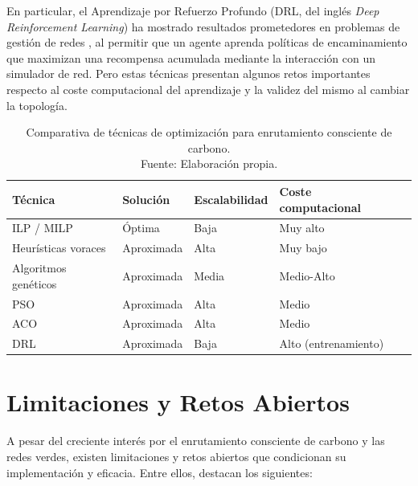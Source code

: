 En particular, el Aprendizaje por Refuerzo Profundo (DRL, del inglés \textit{Deep Reinforcement Learning}) ha mostrado resultados prometedores en problemas de gestión de redes \cite{mao2016drl}, al permitir que un agente aprenda políticas de encaminamiento que maximizan una recompensa acumulada mediante la interacción con un simulador de red. Pero estas técnicas presentan algunos retos importantes respecto al coste computacional del aprendizaje y la validez del mismo al cambiar la topología.

\begin{table}[h]
    \centering
    \captionsetup{justification=centering}
    \label{tab:comparativa_optimizacion}
    \renewcommand{\arraystretch}{1.4}
    \begin{tabular}{|l|l|l|l|l|}
        \hline
        \textbf{Técnica} & \textbf{Solución} & \textbf{Escalabilidad} & \textbf{Coste computacional} \\
        \hline
        ILP / MILP         & Óptima       & Baja    & Muy alto  \\
        
        Heurísticas voraces & Aproximada  & Alta    & Muy bajo  \\
        
        Algoritmos genéticos & Aproximada & Media    & Medio-Alto     \\
        
        PSO                & Aproximada   & Alta    & Medio     \\
        
        ACO                & Aproximada   & Alta    & Medio     \\
        
        DRL                & Aproximada   & Baja    & Alto (entrenamiento)  \\
        \hline
    \end{tabular}
    \caption[Comparativa técnicas de optimización]{Comparativa de técnicas de optimización para enrutamiento consciente de carbono.\\Fuente: Elaboración propia.}
\end{table}

\section{Limitaciones y Retos Abiertos}

A pesar del creciente interés por el enrutamiento consciente de carbono y las redes verdes, existen limitaciones y retos abiertos que condicionan su implementación y eficacia. Entre ellos, destacan los siguientes:

